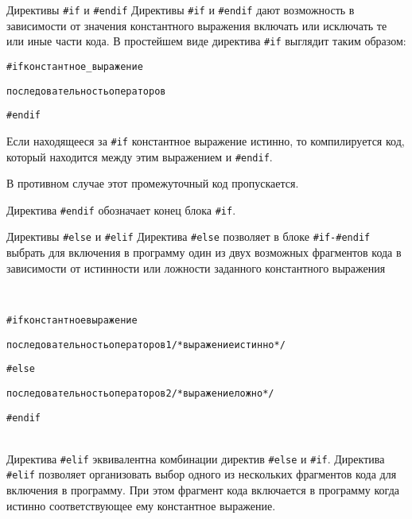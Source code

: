 \documentclass{beamer}
\begin{document}
\begin{frame}{Директивы \texttt{#if} и \texttt{#endif}}
    Директивы \texttt{\#if} и \texttt{\#endif} дают возможность в зависимости от значения константного выражения включать или исключать те или иные части кода. В простейшем виде директива \texttt{\#if} выглядит таким образом:
    
    \begin{alltt}
        \#if константное\_выражение
        
        \qquad последовательность операторов
        
        \#endif
    \end{alltt}
    
    Если находящееся за \texttt{\#if} константное выражение истинно, то компилируется код, который находится между этим выражением и \texttt{\#endif}.
    
    \medskip
    В противном случае этот промежуточный код пропускается.
    
    \medskip
    Директива \texttt{\#endif} обозначает конец блока \texttt{\#if}.
\end{frame}

\begin{frame}{Директивы \texttt{\#else} и \texttt{\#elif}}
    Директива \texttt{\#else} позволяет в блоке \texttt{\#if-\#endif} выбрать для включения в программу один из двух возможных фрагментов кода в зависимости от истинности или ложности заданного константного выражения
    
    \\
    \begin{alltt}
        \#if константное выражение
        
        \qquad последовательность операторов 1 /* выражение истинно */
        
        \#else
        
        \qquad последовательность операторов 2 /* выражение ложно */
        
        \#endif
    \end{alltt}
    
    \\
    Директива \texttt{\#elif} эквивалентна комбинации директив \texttt{\#else} и \texttt{\#if}. Директива \texttt{\#elif} позволяет организовать выбор одного из нескольких фрагментов кода для включения в программу. При этом фрагмент кода включается в программу когда истинно соответствующее ему константное выражение.
\end{frame}
\end{document}
